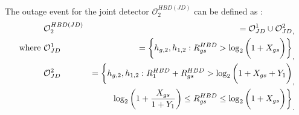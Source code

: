 The outage event for the joint detector $\mathcal{O}_{2}^{HBD(JD)}$ can be defined as \cite{tan2018joint}:
\begin{eqnarray}
							& \mathcal{O}_{2}^{HBD(JD)} & = \mathcal{O}_{JD}^{1} \cup {\mathcal{O}_{JD}^{2}}_, \label{HBD_UCS_Rician_Shadowed_outage_JD_overall} \\
\text{where } & \mathcal{O}_{JD}^{1} 			&	=  \bigg\{h_{g,2}, h_{1,2} : R_{gs}^{HBD} > \log_{2}\bigg(1+X_{gs}\bigg) \bigg\}_, \label{HBD_UCS_Rician_Shadowed_outage_JD_soi} \\
							& \mathcal{O}_{JD}^{2} 			& = \hspace{0cm} \bigg\{h_{g,2}, h_{1,2} : R_{1}^{HBD} + R_{gs}^{HBD} > \log_{2}\bigg(1+X_{gs}+Y_{1} \bigg)_, \nonumber\\
							&														& \hspace{0.5cm} \log_{2}\bigg(1+\frac{X_{gs}}{1+Y_{1}} \bigg) \leq R_{gs}^{HBD} \leq \log_{2}\bigg(1+X_{gs}\bigg) \bigg\}_. \label{HBD_UCS_Rician_Shadowed_outage_JD_int}
\end{eqnarray}

